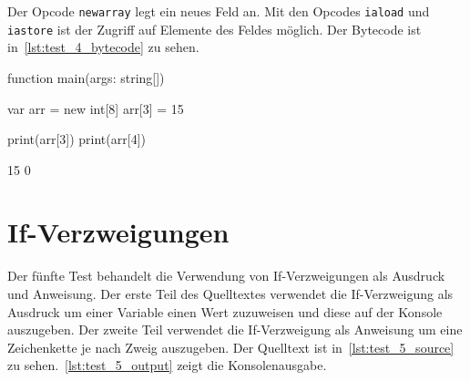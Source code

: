 Der Opcode \texttt{newarray} legt ein neues Feld an. Mit den Opcodes \texttt{iaload} und \texttt{iastore} ist der Zugriff auf Elemente des Feldes möglich. Der Bytecode ist in~\autoref{lst:test_4_bytecode} zu sehen.

\begin{ToyaCode}[numbers=none, caption={Felder},label=lst:test_4_source]
function main(args: string[]) {
    var arr = new int[8]
    arr[3] = 15

    print(arr[3])
    print(arr[4])
}
\end{ToyaCode}


\begin{ToyaCode}[numbers=none, caption={Konsolen-Ausgabe der Felder},label=lst:test_4_output]
15
0    
\end{ToyaCode}

\section{If-Verzweigungen}

Der fünfte Test behandelt die Verwendung von If-Verzweigungen als Ausdruck und Anweisung. Der erste Teil des Quelltextes verwendet die If-Verzweigung als Ausdruck um einer Variable einen Wert zuzuweisen und diese auf der Konsole auszugeben. Der zweite Teil verwendet die If-Verzweigung als Anweisung um eine Zeichenkette je nach Zweig auszugeben. Der Quelltext ist in~\autoref{lst:test_5_source} zu sehen.~\autoref{lst:test_5_output} zeigt die Konsolenausgabe.

